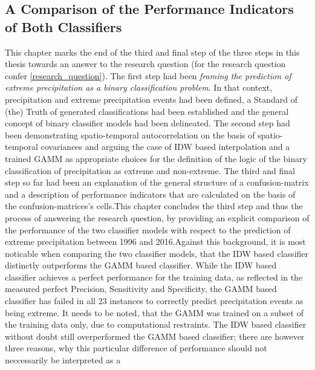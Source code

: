 \documentclass[
  12pt,
]{article}
\begin{document}
\hypertarget{a-comparison-of-the-performance-indicators-of-both-classifiers}{%
\subsection{A Comparison of the Performance Indicators of Both
Classifiers}\label{a-comparison-of-the-performance-indicators-of-both-classifiers}}

This chapter marks the end of the third and final step of the three
steps in this thesis towards an answer to the research question (for the
research question confer \ref{research_question}). The first step had
been
\textit{framing the prediction of extreme precipitation as a binary classification problem}.
In that context, precipitation and extreme precipitation events had been
defined, a Standard of (the) Truth of generated classifications had been
established and the general concept of binary classifier models had been
delineated. The second step had been demonstrating spatio-temporal
autocorrelation on the basis of spatio-temporal covariances and arguing
the case of IDW based interpolation and a trained GAMM as appropriate
choices for the definition of the logic of the binary classification of
precipitation as extreme and non-extreme. The third and final step so
far had been an explanation of the general structure of a
confusion-matrix and a description of performance indicators that are
calculated on the basis of the confusion-matrices's cells.\newline This
chapter concludes the third step and thus the process of answering the
research question, by providing an explicit comparison of the
performance of the two classifier models with respect to the prediction
of extreme precipitation between 1996 and 2016.\newline Against this
background, it is most noticable when comparing the two classifier
models, that the IDW based classifier distinctly outperforms the GAMM
based classifier. While the IDW based classifier achieves a perfect
performance for the training data, as reflected in the measured perfect
Precision, Sensitivity and Specificity, the GAMM based classifier has
failed in all 23 instances to correctly predict precipitation events as
being extreme. It needs to be noted, that the GAMM was trained on a
subset of the training data only, due to computational restraints. The
IDW based classifier without doubt still overperformed the GAMM based
classifier; there are however three reasons, why this particular
difference of performance should not neccessarily be interpreted as a
\end{document}
